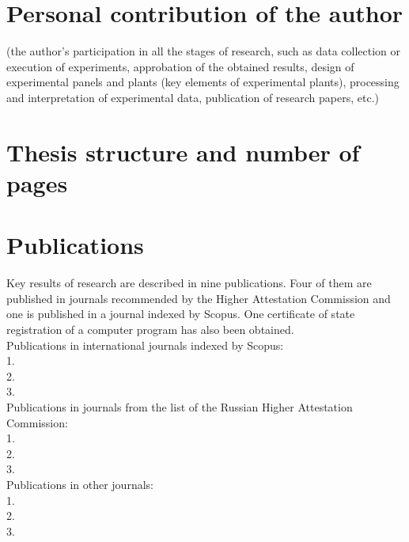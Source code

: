\section*{Personal contribution of the author}
(the author's participation in all the stages of research, such as data collection or execution of experiments, approbation of the obtained results, design of experimental panels and plants (key elements of experimental plants), processing and interpretation of experimental data, publication of research papers, etc.)

\section*{Thesis structure and number of pages}
\section*{Publications}
Key results of research are described in nine publications. Four of them are published in journals recommended by the Higher Attestation Commission and one is published in a journal indexed by Scopus. One certificate of state registration of a computer program has also been obtained.\\

Publications in international journals indexed by Scopus:\\
1.\\
2.\\
3.\\

Publications in journals from the list of the Russian Higher Attestation Commission:\\
1.\\
2.\\
3.\\

Publications in other journals:\\
1.\\
2.\\
3.
